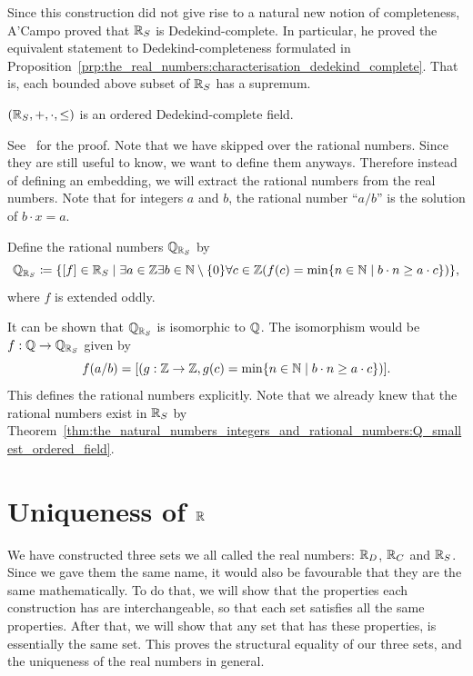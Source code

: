 \documentclass[../main.tex]{subfiles}
\begin{document}
Since this construction did not give rise to a natural new notion of completeness, A'Campo proved that $\mathbb{R}_S$ is Dedekind-complete. In particular, he proved the equivalent statement to Dedekind-completeness formulated in Proposition~\ref{prp:the_real_numbers:characterisation_dedekind_complete}. That is, each bounded above subset of $\mathbb{R}_S$ has a supremum.
\begin{proposition}\label{prp:the_real_numbers:schanuel_R_dedekind_complete}
    $(\mathbb{R}_S,+,\cdot,\leq)$ is an ordered Dedekind-complete field.
\end{proposition}
See~\cite{ACampo2003} for the proof. Note that we have skipped over the rational numbers. Since they are still useful to know, we want to define them anyways. Therefore instead of defining an embedding, we will extract the rational numbers from the real numbers. Note that for integers $a$ and $b$, the rational number ``$a/b$'' is the solution of $b\cdot x=a$.
\begin{definition}
    Define the rational numbers $\mathbb{Q}_{\mathbb{R}_S}$ by
    \begin{equation*}
        \mathbb{Q}_{\mathbb{R}_S}\coloneq\{[f]\in\mathbb{R}_S\mid\exists a\in\mathbb{Z}\exists b\in\mathbb{N}\setminus\{0\}\forall c\in\mathbb{Z}(f(c)=\min\{n\in\mathbb{N}\mid b\cdot n\geq a\cdot c\})\},
    \end{equation*}
    where $f$ is extended oddly.
\end{definition}
It can be shown that $\mathbb{Q}_{\mathbb{R}_S}$ is isomorphic to $\mathbb{Q}$. The isomorphism would be $f:\mathbb{Q}\to\mathbb{Q}_{\mathbb{R}_S}$ given by 
\begin{equation*}
    f(a/b)=[(g:\mathbb{Z}\to\mathbb{Z},g(c)=\min\{n\in\mathbb{N}\mid b\cdot n\geq a\cdot c\})].
\end{equation*}
This defines the rational numbers explicitly. Note that we already knew that the rational numbers exist in $\mathbb{R}_S$ by Theorem~\ref{thm:the_natural_numbers_integers_and_rational_numbers:Q_smallest_ordered_field}.

\section{Uniqueness of \texorpdfstring{$\mathbb{R}$}{ℝ}}\label{sec:the_real_numbers:uniqueness_of_R}
We have constructed three sets we all called the real numbers: $\mathbb{R}_D$, $\mathbb{R}_C$ and $\mathbb{R}_S$. Since we gave them the same name, it would also be favourable that they are the same mathematically. To do that, we will show that the properties each construction has are interchangeable, so that each set satisfies all the same properties. After that, we will show that any set that has these properties, is essentially the same set. This proves the structural equality of our three sets, and the uniqueness of the real numbers in general.
\end{document}
